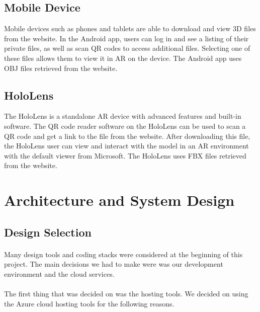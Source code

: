 \subsection{Mobile Device}
Mobile devices such as phones and tablets are able to download and view 3D files from the website. In the Android app, users can log in and see a listing of their private files, as well as scan QR codes to access additional files. Selecting one of these files allows them to view it in AR on the device. The Android app uses OBJ files retrieved from the website.

\subsection{HoloLens}
The HoloLens is a standalone AR device with advanced features and built-in software. The QR code reader software on the HoloLens can be used to scan a QR code and get a link to the file from the website. After downloading this file, the HoloLens user can view and interact with the model in an AR environment with the default viewer from Microsoft. The HoloLens uses FBX files retrieved from the website.

 \section{Architecture and System Design}
 
 
 
   \subsection{Design Selection}
   \paragraph{}
 Many design tools and coding stacks were considered at the beginning of this project.
 The main decisions we had to make were was our development environment and the cloud services.
 
 \paragraph{}
 The first thing that was decided on was the hosting tools.
 We decided on using the Azure cloud hosting tools for the following reasons.

